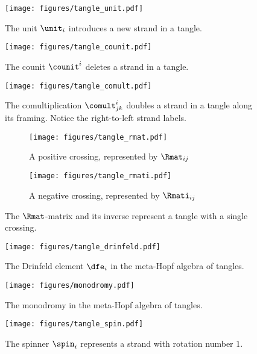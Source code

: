 \begin{figure}[h]
        \centering
        \texttt{[image: figures/tangle\_unit.pdf]}
        \caption{The unit $\unit_i$ introduces a new strand in a tangle.}
        \label{fig:tangle_unit}
\end{figure}
\begin{figure}[h]
        \centering
        \texttt{[image: figures/tangle\_counit.pdf]}
        \caption{The counit $\counit^i$ deletes a strand in a tangle.}
        \label{fig:tangle_counit}
\end{figure}
\begin{figure}[h]
\centering
\texttt{[image: figures/tangle\_comult.pdf]}
\caption{The comultiplication $\comult^{i}_{jk}$ doubles a strand in a tangle
along its framing. Notice the right-to-left strand labels.}
\label{fig:tangle_comult}
\end{figure}
\begin{figure}[h]
        \centering
        \begin{subfigure}[b]{0.4\textwidth}
                \centering
                \texttt{[image: figures/tangle\_rmat.pdf]}
                \caption{A positive crossing, represented by $\Rmat_{ij}$}
                \label{fig:tangle_rmat}
        \end{subfigure}
        \begin{subfigure}[b]{0.4\textwidth}
                \centering
                \texttt{[image: figures/tangle\_rmati.pdf]}
                \caption{A negative crossing, represented by $\Rmati_{ij}$}
                \label{fig:tangle_rmati}
        \end{subfigure}
        \caption{The $\Rmat$-matrix and its inverse represent a tangle with a
        single crossing.}
\end{figure}
\begin{figure}[h]
        \centering
        \texttt{[image: figures/tangle\_drinfeld.pdf]}
        \caption{The Drinfeld element $\dfe_i$ in the meta-Hopf algebra of
        tangles.}
        \label{fig:tangle_drinfeld}
\end{figure}
\begin{figure}[h]
        \centering
        \texttt{[image: figures/monodromy.pdf]}
        \caption{The monodromy in the meta-Hopf algebra of tangles.}
        \label{fig:monodromy}
\end{figure}
\begin{figure}[h]
        \centering
        \texttt{[image: figures/tangle\_spin.pdf]}
        \caption{The spinner $\spin_i$ represents a strand with rotation number
        $1$.}
        \label{fig:tangle_spin}
\end{figure}
